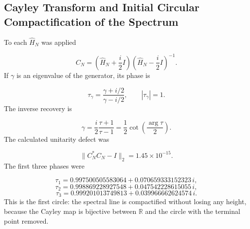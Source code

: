 \subsection{Cayley Transform and Initial Circular Compactification of the Spectrum}
To each \(\widehat H_N\) was applied\par
\[
C_N=
\left(\widehat H_N+\frac{i}{2}I\right)
\left(\widehat H_N-\frac{i}{2}I\right)^{-1}.
\]
If \(\gamma\) is an eigenvalue of the generator, its phase is\par
\[
\tau_\gamma
=
\frac{\gamma+i/2}{\gamma-i/2},
\qquad |\tau_\gamma|=1.
\]
The inverse recovery is\par
\[
\gamma
=
\frac{i}{2}\frac{\tau+1}{\tau-1}
=
\frac12\cot\!\left(\frac{\arg\tau}{2}\right).
\]
The calculated unitarity defect was\par
\[
\|C_N^*C_N-I\|_2=1.45\times10^{-15}.
\]
The first three phases were\par
\[
\tau_1=
0.997500505583064
+0.070659333152323\,i,
\]
\[
\tau_2=
0.998869228927548
+0.047542228615055\,i,
\]
\[
\tau_3=
0.999201013749813
+0.039966662624574\,i.
\]
This is the first circle: the spectral line is compactified without losing any height, because the Cayley map is bijective between \(\mathbb R\) and the circle with the terminal point removed.\par
{}
